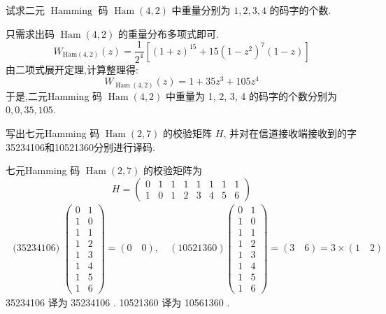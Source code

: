 \begin{exercise}
试求二元 $ \operatorname{Hamming} $ 码 $ \operatorname{Ham}(4,2) $ 中重量分别为 $ 1,2,3,4 $ 的码字的个数.
\end{exercise}
\begin{solution}
只需求出码 $ \operatorname{Ham}(4,2) $ 的重量分布多项式即可.
$$ W_{\mathrm{Ham}(4,2)}(z)=\frac{1}{2^{4}}\left[(1+z)^{15}+15\left(1-z^{2}\right)^{7}(1-z)\right] $$
由二项式展开定理,计算整理得:
$$
W_{\operatorname{Ham}(4,2)}(z)=1+35 z^{3}+105 z^{4}
$$
于是,二元Hamming 码 $ \operatorname{Ham}(4,2) $ 中重量为 1, 2, 3, 4 的码字的个数分别为 $ 0,0,35,105 $.
\end{solution}

\begin{exercise}
 写出七元Hamming 码 $ \operatorname{Ham}(2,7) $ 的校验矩阵 $ H $, 并对在信道接收端接收到的字35234106和10521360分别进行译码.
\end{exercise}
\begin{solution}
七元Hamming 码 $ \operatorname{Ham}(2,7) $ 的校验矩阵为
$$H=\left(\begin{array}{llllllll}
0 & 1 & 1 & 1 & 1 & 1 & 1 & 1 \\
1 & 0 & 1 & 2 & 3 & 4 & 5 & 6
\end{array}\right) $$
$$
\begin{array}{c}
\text { (35234106) }\left(\begin{array}{ll}
0 & 1 \\
1 & 0 \\
1 & 1 \\
1 & 2 \\
1 & 3 \\
1 & 4 \\
1 & 5 \\
1 & 6
\end{array}\right)=(0\quad0),\quad (10521360)\left(\begin{array}{ll}
0 & 1 \\
1 & 0 \\
1 & 1 \\
1 & 2 \\
1 & 3 \\
1 & 4 \\
1 & 5 \\
1 & 6
\end{array}\right)=(3\quad6)=3 \times(1\quad2)
\end{array}
$$
35234106 译为 35234106 . 10521360 译为 10561360 .
\end{solution}


